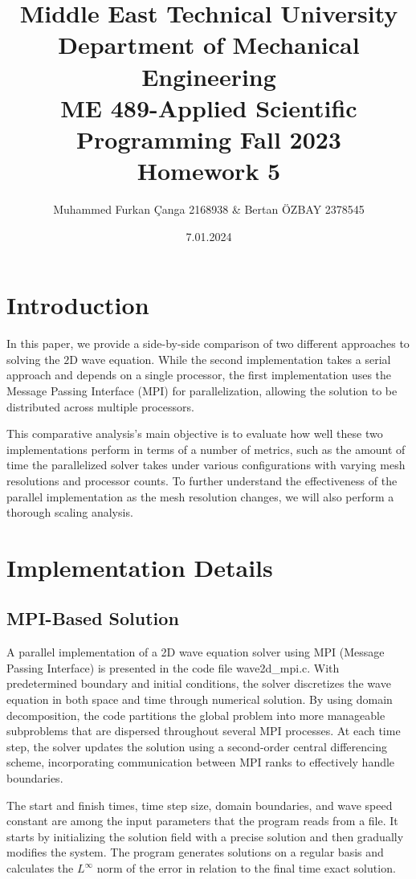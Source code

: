 \documentclass[10pt]{article}
\title{Middle East Technical University
Department of Mechanical Engineering
\\ME 489-Applied Scientific Programming
Fall 2023
\\Homework 5 }
\author{Muhammed Furkan Çanga 2168938 & Bertan ÖZBAY 2378545}
\date{7.01.2024}
\begin{document}
\maketitle

\section{Introduction}
In this paper, we provide a side-by-side comparison of two different approaches to solving the $2 \mathrm{D}$ wave equation. While the second implementation takes a serial approach and depends on a single processor, the first implementation uses the Message Passing Interface (MPI) for parallelization, allowing the solution to be distributed across multiple processors.

This comparative analysis's main objective is to evaluate how well these two implementations perform in terms of a number of metrics, such as the amount of time the parallelized solver takes under various configurations with varying mesh resolutions and processor counts. To further understand the effectiveness of the parallel implementation as the mesh resolution changes, we will also perform a thorough scaling analysis.

\section{Implementation Details}
\subsection{MPI-Based Solution}
A parallel implementation of a 2D wave equation solver using MPI (Message Passing Interface) is presented in the code file wave2d\_mpi.c. With predetermined boundary and initial conditions, the solver discretizes the wave equation in both space and time through numerical solution. By using domain decomposition, the code partitions the global problem into more manageable subproblems that are dispersed throughout several MPI processes. At each time step, the solver updates the solution using a second-order central differencing scheme, incorporating communication between MPI ranks to effectively handle boundaries.

The start and finish times, time step size, domain boundaries, and wave speed constant are among the input parameters that the program reads from a file. It starts by initializing the solution field with a precise solution and then gradually modifies the system. The program generates solutions on a regular basis and calculates the $L^{\infty}$ norm of the error in relation to the final time exact solution.
\end{document}
